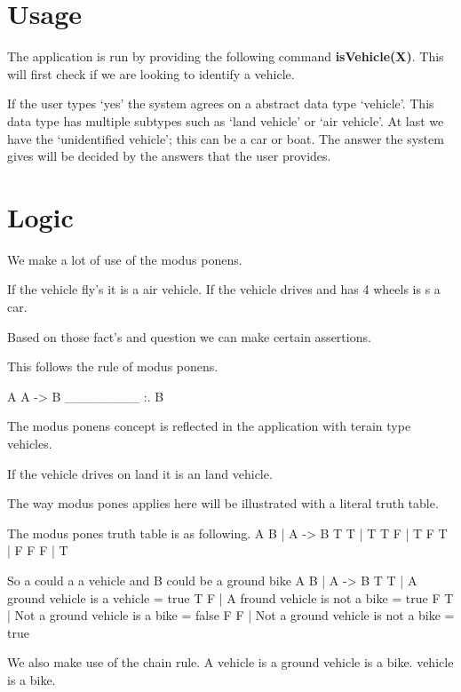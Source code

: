 \section{Usage} \label{man-usage}
The application is run by providing the following command \textbf{isVehicle(X)}.
This will first check if we are looking to identify a vehicle.

If the user types `yes' the system agrees on a abstract data type `vehicle'.
This data type has multiple subtypes such as `land vehicle' or `air vehicle'.
At last we have the `unidentified vehicle'; this can be a car or boat.
The answer the system gives will be decided by the answers that the user provides.

\newpage
\section{Logic} \label{man-logic}
We make a lot of use of the modus ponens.

If the vehicle fly's it is a air vehicle.
If the vehicle drives and has 4 wheels is s a car.

Based on those fact's and question we can make certain assertions.

This follows the rule of modus ponens.

A
A -> B
\_\_\_\_\_\_\_\_
:. B 

The modus ponens concept is reflected in the application with terain type vehicles.

If the vehicle drives on land it is an land vehicle.

The way modus pones applies here will be illustrated with a literal truth table.

The modus pones truth table is as following.
A B | A -> B
T T | T
T F | T
F T | F
F F | T

So a could a a vehicle
and B could be a ground bike
A B | A -> B
T T | A ground vehicle is a vehicle      = true
T F | A fround vehicle is not a bike     = true 
F T | Not a ground vehicle is a bike     = false
F F | Not a ground vehicle is not a bike = true

We also make use of the chain rule.
A vehicle is a ground vehicle is a bike.
vehicle is a bike.


